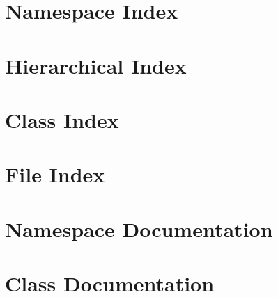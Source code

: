 \documentclass[twoside]{book}
\newcommand{\+}{\discretionary{\mbox{\scriptsize$\hookleftarrow$}}{}{}}
\begin{document}
  \raggedbottom
    \hypersetup{pageanchor=false,
                bookmarksnumbered=true
               }
  \hypersetup{pageanchor=true}

\chapter{Namespace Index}

\chapter{Hierarchical Index}

\chapter{Class Index}

\chapter{File Index}

\chapter{Namespace Documentation}



\chapter{Class Documentation}










\end{document}
